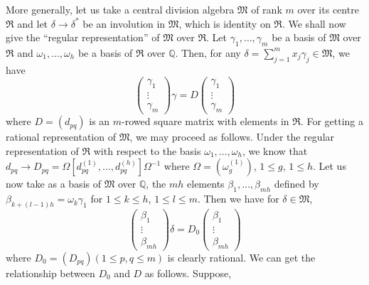 \begin{remark*}
More generally, let us take a central division algebra $\mathfrak{M}$
of \pageoriginale rank $m$ over its centre $\mathfrak{R}$ and let
$\delta \rightarrow \delta^{\ast}$ be an involution in $\mathfrak{M}$,
which is identity on $\mathfrak{R}$. We shall now give the ``regular
representation'' of $\mathfrak{M}$ over $\mathfrak{R}$. Let $\gamma_1,
\ldots, \gamma_m$ be a basis of $\mathfrak{M}$ over $\mathfrak{R}$ and
$\omega_1, \ldots, \omega_h$ be a basis of $\mathfrak{R}$ over
$\mathbb{Q}$. Then, for any $\delta = \sum\limits^m_{j=1} x_j \gamma_j
\in \mathfrak{M}$, we have 
\begin{equation*}
\left(\begin{smallmatrix} \gamma_1 \\ \vdots
  \\\gamma_m \end{smallmatrix}\right) \gamma = D 
\left(\begin{smallmatrix} \gamma_1 \\ \vdots
  \\\gamma_m \end{smallmatrix}\right) \tag{20}\label{eq20}
\end{equation*}
where $D = (d_{pq})$ is an $m$-rowed square matrix with elements in
$\mathfrak{R}$. For getting a rational representation of
$\mathfrak{M}$, we may proceed as follows. Under the regular
representation of $\mathfrak{R}$ with respect to the basis $\omega_1,
\ldots, \omega_h$, we know that $d_{pq} \rightarrow D_{pq} = \Omega
[d^{(1)}_{pq}, \ldots, d^{(h)}_{pq}] \Omega^{-1}$ where $\Omega
= (\omega^{(1)}_g)$, $1 \leq g$, $1\leq h$. Let us now take as a
basis of $\mathfrak{M}$ over $\mathbb{Q}$, the $mh$ elements
$\beta_1,\ldots, \beta_{mh}$ defined by
$\beta_{k+(l-1)h}=\omega_k \gamma_1$ for $1\leq k \leq h$, $1
\leq l \leq m$. Then we have for $\delta \in \mathfrak{M}$, 
\begin{equation*}
\left(\begin{smallmatrix} \beta_1 \\ \vdots
  \\\beta_{mh} \end{smallmatrix}\right) \delta = D_0 
\left(\begin{smallmatrix} \beta_1 \\ \vdots
  \\\beta_{mh} \end{smallmatrix}\right) \tag{21}\label{eq21}
\end{equation*}
where $D_0 = (D_{pq}) (1\leq p, q \leq m)$ is clearly rational. We can
get the relationship between $D_0$ and $D$ as follows. Suppose,

\end{remark*}
